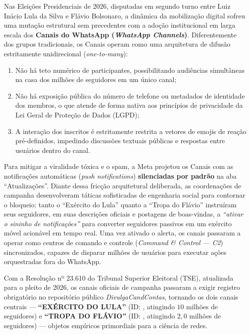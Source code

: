 \documentclass[12pt]{article}
\begin{document}
Nas Eleições Presidenciais de 2026, disputadas em segundo turno entre Luiz Inácio Lula da Silva e Flávio Bolsonaro, a dinâmica da mobilização digital sofreu uma mutação estrutural sem precedentes com a adoção institucional em larga escala dos \textbf{Canais do WhatsApp (\textit{WhatsApp Channels})}. Diferentemente dos grupos tradicionais, os Canais operam como uma arquitetura de difusão estritamente unidirecional (\textit{one-to-many}):
\begin{enumerate}
    \item Não há teto numérico de participantes, possibilitando audiências simultâneas na casa dos milhões de seguidores em um único canal;
    \item Não há exposição pública do número de telefone ou metadados de identidade dos membros, o que atende de forma nativa aos princípios de privacidade da Lei Geral de Proteção de Dados (LGPD);
    \item A interação dos inscritos é estritamente restrita a vetores de emojis de reação pré-definidos, impedindo discussões textuais públicas e respostas entre usuários dentro do canal.
\end{enumerate}

Para mitigar a viralidade tóxica e o spam, a Meta projetou os Canais com as notificações automáticas (\textit{push notifications}) \textbf{silenciadas por padrão} na aba ``Atualizações''. Diante dessa fricção arquitetural deliberada, as coordenações de campanha desenvolveram táticas sofisticadas de engenharia social para contornar o bloqueio: tanto o ``Exército do Lula'' quanto a ``Tropa do Flávio'' instruíram seus seguidores, em suas descrições oficiais e postagens de boas-vindas, a \textit{``ativar o sininho de notificações''} para converter seguidores passivos em um exército móvel acionável em tempo real. Uma vez ativado o alerta, os canais passaram a operar como centros de comando e controle (\textit{Command \& Control --- C2}) sincronizados, capazes de disparar milhões de usuários para executar ações orquestradas fora do WhatsApp.

Com a Resolução nº 23.610 do Tribunal Superior Eleitoral (TSE), atualizada para o pleito de 2026, os canais oficiais de campanha passaram a exigir registro obrigatório no repositório público \textit{DivulgaCandContas}, tornando os dois canais centrais --- \textbf{``EXÉRCITO DO LULA''} (ID: , atingindo $10$ milhões de seguidores) e \textbf{``TROPA DO FLÁVIO''} (ID: , atingindo $2,0$ milhões de seguidores) --- objetos empíricos primordiais para a ciência de redes.
\end{document}

